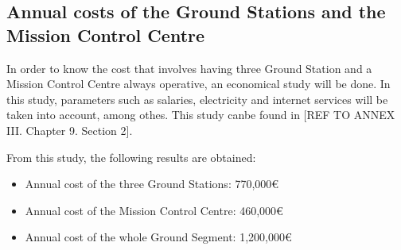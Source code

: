 \subsection{Annual costs of the Ground Stations and the Mission Control Centre}
In order to know the cost that involves having three Ground Station and a Mission Control Centre always operative, an economical study will be done. In this study, parameters such as salaries, electricity and internet services will be taken into account, among othes. This study canbe found in [{REF TO ANNEX III. Chapter 9. Section 2}].

From this study, the following results are obtained:
\begin{itemize}
\item Annual cost of the three Ground Stations: 770,000\euro
\item Annual cost of the Mission Control Centre: 460,000\euro
\item Annual cost of the whole Ground Segment: 1,200,000\euro
\end{itemize}